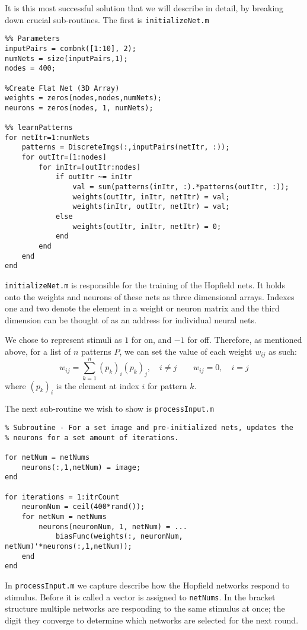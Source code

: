 \documentclass[]{article}
\theoremstyle{plain}
\theoremstyle{definition}
\begin{document}
It is this most successful solution that we will describe in detail, by breaking down crucial sub-routines. The first is \texttt{initializeNet.m}

\singlespacing
\begin{verbatim}
%% Parameters
inputPairs = combnk([1:10], 2);
numNets = size(inputPairs,1);
nodes = 400;

%Create Flat Net (3D Array)
weights = zeros(nodes,nodes,numNets);
neurons = zeros(nodes, 1, numNets);

%% learnPatterns
for netItr=1:numNets
    patterns = DiscreteImgs(:,inputPairs(netItr, :));
    for outItr=[1:nodes] 
        for inItr=[outItr:nodes]
            if outItr ~= inItr
                val = sum(patterns(inItr, :).*patterns(outItr, :));
                weights(outItr, inItr, netItr) = val;
                weights(inItr, outItr, netItr) = val;
            else
                weights(outItr, inItr, netItr) = 0;
            end
        end
    end
end
\end{verbatim}
\doublespacing
\texttt{initializeNet.m} is responsible for the training of the Hopfield nets. It holds onto the weights and neurons of these nets as three dimensional arrays. Indexes one and two denote the element in a weight or neuron matrix and the third dimension can be thought of as an address for individual neural nets. 

We chose to represent stimuli as $ 1 $ for on, and $ -1 $ for off. Therefore, as mentioned above, for a list of $ n $ patterns $ P $, we can set the value of each weight $ w_{ij} $ as such:
\[ w_{ij} = \sum\limits_{k = 1}^{n}(p_{k})_i(p_{k})_j, \quad i\neq j \qquad w_{ij} = 0, \quad i=j \] where $ (p_k)_i $ is the element at index $ i $ for pattern $ k $.

The next sub-routine we wish to show is \texttt{processInput.m}

\singlespacing
\begin{verbatim}
% Subroutine - For a set image and pre-initialized nets, updates the
% neurons for a set amount of iterations. 

for netNum = netNums
    neurons(:,1,netNum) = image;
end

for iterations = 1:itrCount
    neuronNum = ceil(400*rand());
    for netNum = netNums
        neurons(neuronNum, 1, netNum) = ...
            biasFunc(weights(:, neuronNum, netNum)'*neurons(:,1,netNum));
    end
end
\end{verbatim}
\doublespacing
\quad In \texttt{processInput.m} we capture describe how the Hopfield networks respond to stimulus. Before it is called a vector is assigned to \texttt{netNums}. In the bracket structure multiple networks are responding to the same stimulus at once; the digit they converge to determine which networks are selected for the next round. 
\end{document}
